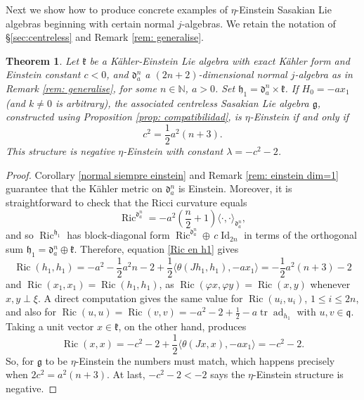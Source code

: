 \documentclass[12pt, twoside]{amsart}
\def\d{\mathfrak{d}}
\def\k{\mathfrak{k}}
\def\g{\mathfrak{g}}
\def\h{\mathfrak{h}}
\def\q{\mathfrak{q}}
\def\N{\mathbb{N}}
\def\ad{\operatorname{ad}}
\DeclareMathOperator{\Id}{\operatorname{Id}}
\def\pint{\langle \cdotp,\cdotp \rangle }
\def\ric{\operatorname{Ric}}
\def\tr{\operatorname{tr}}
\newtheorem{thm}[definition]{Theorem}
\theoremstyle{definition}
\begin{document}
\bigbreak
\bigbreak

Next we show how to produce concrete examples of $\eta$-Einstein Sasakian Lie algebras beginning with certain normal $j$-algebras. We retain the notation of  \S \ref{sec:centreless} and Remark \ref{rem: generalise}. 

\begin{thm}\label{thm: examples with H0 no nulo}
Let $\k$ be a K{\"a}hler-Einstein Lie algebra with exact K{\"a}hler form and 
Einstein constant $c<0$, and $\d_a^n$ a $(2n+2)$-dimensional normal $j$-algebra as in Remark \ref{rem: generalise}, for some $n\in\N$, $a>0$. Set $\h_1 = \d_a^n\times\k$. If $H_0=-ax_1$ (and $k\neq 0$ is arbitrary), the associated centreless Sasakian Lie algebra $\g$, constructed using Proposition \ref{prop: compatibilidad}, is $\eta$-Einstein if and only if \[c^{2}=\frac12 a^2(n+3).\]
This structure is negative $\eta$-Einstein with constant $\lambda=-c^2-2$.
\end{thm}

\begin{proof}
Corollary \ref{normal siempre einstein} and Remark \ref{rem: einstein dim=1} guarantee that the K{\"a}hler metric on $\d_a^n$ is Einstein. 
Moreover, it is straightforward to check that the Ricci curvature equals 
\begin{equation}\label{Ricci en normal con 1 raiz}
    \ric^{\d_a^n}= -a^2\left(\frac{n}{2}+1\right) \pint_{\d_a^n},
\end{equation}
and so $\ric^{\h_1}$ has block-diagonal form 
$\ric^{\d_a^n} \oplus\, c\Id_{2n}$ in terms of the orthogonal sum $\h_1=\d_a^n\oplus \k$. Therefore, equation \eqref{Ric en h1} gives 
\[ \ric (h_1,h_1)=-a^{2}-\frac{1}{2}a^{2}n-2+\frac{1}{2}\langle \theta(Jh_1,h_1), -ax_1\rangle=-\frac{1}{2}a^{2}(n+3)-2\]
and $\ric (x_1,x_1)=\ric (h_1,h_1)$, as $\ric(\varphi x,\varphi y)=\ric (x,y)$ whenever $x,y\perp \xi$. A direct computation gives the same value for $\ric (u_i, u_i)$, $1\leq i \leq 2n$,  
and also for $\ric(u,u)=\ric (v, v)=-a^{2}-2+\frac{1}{2}-a\tr\ad_{h_1}$ 
with $u,v\in {\q}$.  Taking a unit vector $x\in \k$, on the other hand, produces
\[ 
\ric (x, x)=-c^{2}-2+\frac{1}{2}\langle \theta(Jx, x), -ax_1 \rangle=-c^{2}-2.
\]
So, for $\g$ to be $\eta$-Einstein the numbers must match, which happens precisely when $2c^{2}=a^{2}(n+3)$. At last, $-c^2-2<-2$ says the $\eta$-Einstein structure is negative.
\end{proof}

\bigbreak 
\end{document}
